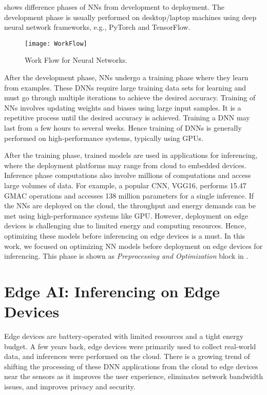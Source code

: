  shows difference phases of NNs from development to deployment. The development phase is usually performed on desktop/laptop machines using deep neural network frameworks, e.g., PyTorch and TensorFlow. 
\begin{figure}[!htb]
	\centering
	\captionsetup{font=sf}
	\texttt{[image: WorkFlow]}
	\caption{Work Flow for Neural Networks.}
	\label{fig:workFlow}
\end{figure}
After the development phase, NNs undergo a training phase where they learn from examples. These DNNs require large training data sets for learning and must go through multiple iterations to achieve the desired accuracy. Training of NNs involves updating weights and biases using large input samples. It is a repetitive process until the desired accuracy is achieved. Training a DNN may last from a few hours to several weeks. Hence training of DNNs is generally performed on high-performance systems, typically using GPUs. 

After the training phase, trained models are used in applications for inferencing, where the deployment platforms may range from cloud to embedded devices. Inference phase computations also involve millions of computations and access large volumes of data. For example, a popular CNN, VGG16, performs 15.47 GMAC operations and accesses 138 million parameters for a single inference. If the NNs are deployed on the cloud, the throughput and energy demands can be met using high-performance systems like GPU. However,  deployment on edge devices is challenging due to limited energy and computing resources. Hence, optimizing these models before inferencing on edge devices is a must. In this work, we focused on optimizing NN models before deployment on edge devices for inferencing. This phase is shown as \emph{Preprocessing and Optimization} block in .

\section{Edge AI: Inferencing on Edge Devices}
Edge devices are battery-operated with limited resources and a tight energy budget. A few years back, edge devices were primarily used to collect real-world data, and inferences were performed on the cloud. There is a growing trend of shifting the processing of these DNN applications from the cloud to edge devices near the sensors as it improves the user experience, eliminates network bandwidth issues, and improves privacy and security. 

